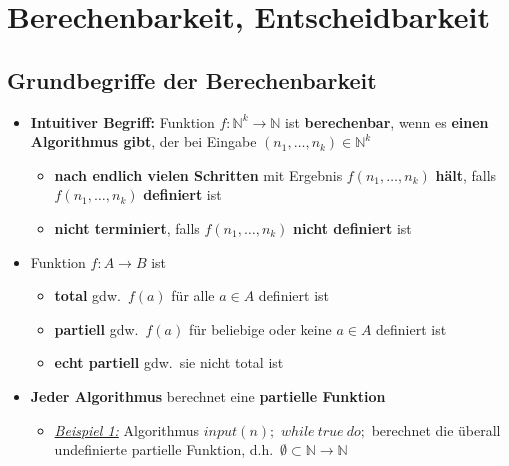 \documentclass[ieeetran]{article}
\begin{document}
\section{Berechenbarkeit, Entscheidbarkeit} %
\label{sec:berechenbarkeit_entscheidbarkeit}

\subsection{Grundbegriffe der Berechenbarkeit} %
\label{sub:berechenbarkeit}
\begin{itemize}
	\item \textbf{Intuitiver Begriff:} Funktion $f: \mathbb{N}^k \rightarrow \mathbb{N}$ ist \textbf{berechenbar}, wenn es \textbf{einen Algorithmus gibt}, der bei Eingabe $(n_1, \ldots, n_k) \in \mathbb{N}^k$
	\begin{itemize}
	  \item \textbf{nach endlich vielen Schritten} mit Ergebnis $f(n_1, \ldots, n_k)$ \textbf{hält}, falls $f(n_1, \ldots, n_k)$ \textbf{definiert} ist
	\item \textbf{nicht terminiert}, falls $f(n_1, \ldots, n_k)$ \textbf{nicht definiert} ist 
	\end{itemize}


\item Funktion $f: A \rightarrow B$ ist
	\begin{itemize}
	  \item \textbf{total} gdw.\ $f(a)$ für alle $a \in A$ definiert ist
	\item \textbf{partiell} gdw.\ $f(a)$ für beliebige oder keine $a \in A$ definiert ist
	\item \textbf{echt partiell} gdw.\ sie nicht total ist
	\end{itemize}

\item \textbf{Jeder Algorithmus} berechnet eine \textbf{partielle Funktion}
	\begin{itemize}
	  \item \textit{\underline{Beispiel 1:}} Algorithmus
		  $input(n);$
		  $while \ true \ do;$ berechnet die überall undefinierte partielle Funktion, d.h.\ $\emptyset \subset \mathbb{N} \rightarrow \mathbb{N}$


\end{itemize}
\end{itemize}
\end{document}
